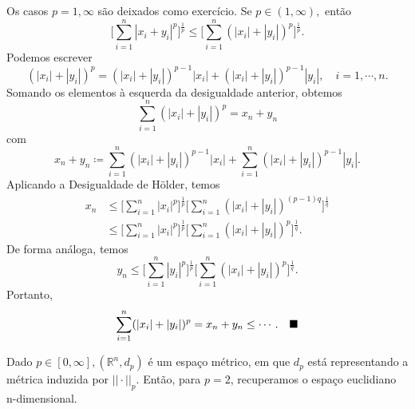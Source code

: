 \documentclass[metric_notes.tex]{subfiles}
\begin{document}
\begin{proof*}
	Os casos \(p=1, \infty\) são deixados como exercício. Se \(p\in(1, \infty),\) então
	\[
		\biggl[\sum\limits_{i=1}^{n}|x_{i}+y_{i}|^{p}\biggr]^{\frac{1}{p}}\leq \biggl[\sum\limits_{i=1}^{n}(|x_{i}|+|y_{i}|)^{p}\biggr]^{\frac{1}{p}}.
	\]
	Podemos escrever
	\[
		(|x_{i}|+|y_{i}|)^{p} = (|x_{i}|+|y_{i}|)^{p-1}|x_{i}|+(|x_{i}|+|y_{i}|)^{p-1}|y_{i}|,\quad i = 1, \cdots, n.
	\]
	Somando os elementos à esquerda da desigualdade anterior, obtemos
	\[
		\sum\limits_{i=1}^{n}(|x_{i}|+|y_{i}|)^{p} = x_{n}+y_{n}
	\]
	com
	\[
		x_{n} + y_{n}\coloneqq \sum\limits_{i=1}^{n}(|x_{i}|+|y_{i}|)^{p-1}|x_{i}| + \sum\limits_{i=1}^{n}(|x_{i}|+|y_{i}|)^{p-1}|y_{i}|.
	\]
	Aplicando a Desigualdade de Hölder, temos
	\begin{align*}
		x_{n} & \leq \biggl[\sum\limits_{i=1}^{n}|x_{i}|^{p}\biggr]^{\frac{1}{p}}\biggl[\sum\limits_{i=1}^{n}(|x_{i}|+|y_{i}|)^{(p-1)q}\biggr]^{\frac{1}{q}} \\
		      & \leq \biggl[\sum\limits_{i=1}^{n}|x_{i}|^{p}\biggr]^{\frac{1}{p}}\biggl[\sum\limits_{i=1}^{n}(|x_{i}|+|y_{i}|)^{p}\biggr]^{\frac{1}{q}}.
	\end{align*}
	De forma análoga, temos
	\[
		y_{n}\leq \biggl[\sum\limits_{i=1}^{n}|y_{i}|^{p}\biggr]^{\frac{1}{p}}\biggl[\sum\limits_{i=1}^{n}(|x_{i}|+|y_{i}|)^{p}\biggr]^{\frac{1}{q}}.
	\]
	Portanto,
	\[
		\sum\limits_{i=1}^{n}(|x_{i}|+|y_{i}|)^{p} = x_{n} + y_{n}\leq \cdots.\quad\text{$\blacksquare$}
	\]
\end{proof*}
\begin{example}
	Dado \(p\in[0, \infty], (\mathbb{R}^{n}, d_{p})\) é um espaço métrico, em que \(d_{p}\) está representando a métrica induzida por \(||\cdot ||_{p}.\) Então, para \(p=2\),
	recuperamos o espaço euclidiano n-dimensional.
\end{example}
\end{document}
